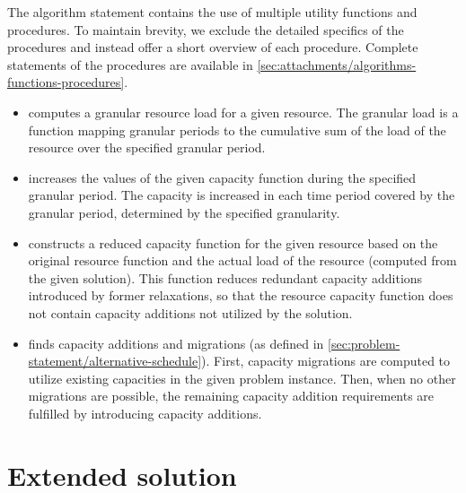 The algorithm statement contains the use of multiple utility functions and procedures.
To maintain brevity,
we exclude the detailed specifics of the procedures and instead offer a short overview of each procedure.
Complete statements of the procedures are available in \cref{sec:attachments/algorithms-functions-procedures}.

\begin{itemize}
    \item {}
        computes a granular resource load for a given resource.
        The granular load is a function mapping granular periods to the cumulative sum of the load
        of the resource over the specified granular period.
        
    \item {}
        increases the values of the given capacity function during the specified granular period.
        The capacity is increased in each time period covered by the granular period,
        determined by the specified granularity.

    \item {}
        constructs a reduced capacity function for the given resource based on the original resource function
        and the actual load of the resource (computed from the given solution).
        This function reduces redundant capacity additions introduced by former relaxations,
        so that the resource capacity function does not contain capacity additions not utilized by the solution.

    \item {}
        finds capacity additions and migrations (as defined in \cref{sec:problem-statement/alternative-schedule}).
        First, capacity migrations are computed to utilize existing capacities in the given problem instance.
        Then, when no other migrations are possible, the remaining capacity addition requirements are fulfilled
        by introducing capacity additions.

\end{itemize}


\section{Extended solution} \label{sec:solution-apporach/extended-solution}

